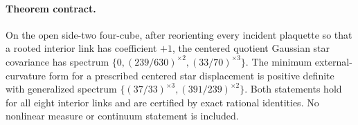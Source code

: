 \paragraph{Theorem contract.}
On the open side-two four-cube, after reorienting every incident plaquette so
that a rooted interior link has coefficient $+1$, the centered quotient
Gaussian star covariance has spectrum
$\{0,(239/630)^{\times2},(33/70)^{\times3}\}$.  The minimum external-curvature
form for a prescribed centered star displacement is positive definite with
generalized spectrum
$\{(37/33)^{\times3},(391/239)^{\times2}\}$.  Both statements hold for all
eight interior links and are certified by exact rational identities.  No
nonlinear measure or continuum statement is included.
